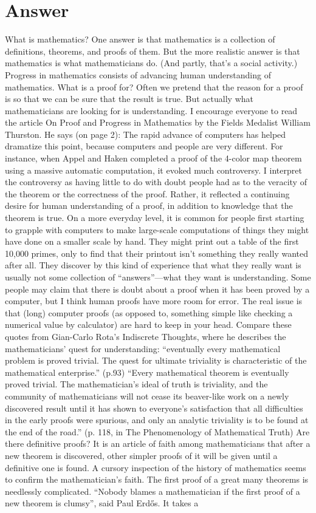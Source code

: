 \documentclass{article}
\begin{document}
\section*{Answer}
What is mathematics? One answer is that mathematics is a collection of definitions, theorems, and proofs of them. But the more realistic answer is that mathematics is what mathematicians do. (And partly, that's a social activity.) Progress in mathematics consists of advancing human understanding of mathematics. What is a proof for? Often we pretend that the reason for a proof is so that we can be sure that the result is true. But actually what mathematicians are looking for is understanding. I encourage everyone to read the article On Proof and Progress in Mathematics by the Fields Medalist William Thurston. He says (on page 2): The rapid advance of computers has helped dramatize this point, because computers and people are very different. For instance, when Appel and Haken completed a proof of the 4-color map theorem using a massive automatic computation, it evoked much controversy. I interpret the controversy as having little to do with doubt people had as to the veracity of the theorem or the correctness of the proof. Rather, it reflected a continuing desire for human understanding of a proof, in addition to knowledge that the theorem is true. On a more everyday level, it is common for people first starting to grapple with computers to make large-scale computations of things they might have done on a smaller scale by hand. They might print out a table of the first 10,000 primes, only to find that their printout isn’t something they really wanted after all. They discover by this kind of experience that what they really want is usually not some collection of “answers”—what they want is understanding. Some people may claim that there is doubt about a proof when it has been proved by a computer, but I think human proofs have more room for error. The real issue is that (long) computer proofs (as opposed to, something simple like checking a numerical value by calculator) are hard to keep in your head. Compare these quotes from Gian-Carlo Rota's Indiscrete Thoughts, where he describes the mathematicians' quest for understanding: “eventually every mathematical problem is proved trivial. The quest for ultimate triviality is characteristic of the mathematical enterprise.” (p.93) “Every mathematical theorem is eventually proved trivial. The mathematician’s ideal of truth is triviality, and the community of mathematicians will not cease its beaver-like work on a newly discovered result until it has shown to everyone’s satisfaction that all difficulties in the early proofs were spurious, and only an analytic triviality is to be found at the end of the road.” (p. 118, in The Phenomenology of Mathematical Truth) Are there definitive proofs? It is an article of faith among mathematicians that after a new theorem is discovered, other simpler proofs of it will be given until a definitive one is found. A cursory inspection of the history of mathematics seems to confirm the mathematician’s faith. The first proof of a great many theorems is needlessly complicated. “Nobody blames a mathematician if the first proof of a new theorem is clumsy”, said Paul Erdős. It takes a 
\end{document}

